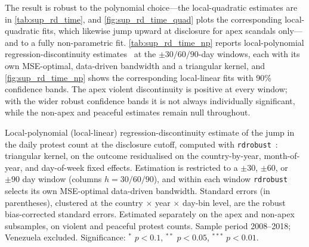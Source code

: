 \documentclass[11pt]{article}
\begin{document}
The result is robust to the polynomial choice---the local-quadratic estimates are in \autoref{tab:sup_rd_time}, and \autoref{fig:sup_rd_time_quad} plots the corresponding local-quadratic fits, which likewise jump upward at disclosure for apex scandals only---and to a fully non-parametric fit. \autoref{tab:sup_rd_time_np} reports local-polynomial regression-discontinuity estimates~\citep{calonico2014robust} at the $\pm30/60/90$-day windows, each with its own MSE-optimal, data-driven bandwidth and a triangular kernel, and \autoref{fig:sup_rd_time_np} shows the corresponding local-linear fits with 90\% confidence bands. The apex violent discontinuity is positive at every window; with the wider robust confidence bands it is not always individually significant, while the non-apex and peaceful estimates remain null throughout.

\begin{table}[htb!]
    \caption{Regression discontinuity in event time: non-parametric estimate.}
    \label{tab:sup_rd_time_np}
    \begin{center}
        \scriptsize{}
    \end{center}
    \footnotesize{Local-polynomial (local-linear) regression-discontinuity estimate of the jump in the daily protest count at the disclosure cutoff, computed with \texttt{rdrobust}~\citep{calonico2014robust}: triangular kernel, on the outcome residualised on the country-by-year, month-of-year, and day-of-week fixed effects. Estimation is restricted to a $\pm30$, $\pm60$, or $\pm90$ day window (columns $h=30/60/90$), and within each window \texttt{rdrobust} selects its own MSE-optimal data-driven bandwidth. Standard errors (in parentheses), clustered at the country $\times$ year $\times$ day-bin level, are the robust bias-corrected standard errors. Estimated separately on the apex and non-apex subsamples, on violent and peaceful protest counts. Sample period 2008--2018; Venezuela excluded. Significance: $^{*}$ $p<0.1$, $^{**}$ $p<0.05$, $^{***}$ $p<0.01$.}
\end{table}
\end{document}
